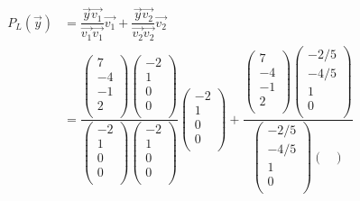 \documentclass[12pt,a4paper]{report}
\begin{document}
\begin{enumerate}
\begin{enumerate}
\begin{align*}
P_{L}(\vec{y})&=\dfrac{\vec{y}\vec{v_{1}}}{\vec{v_{1}}\vec{v_{1}}}\vec{v_{1}}+\dfrac{\vec{y}\vec{v_{2}}}{\vec{v_{2}}\vec{v_{2}}}\vec{v_{2}}\\
&=\dfrac{\begin{pmatrix}
7\\
-4\\
-1\\
2\\
\end{pmatrix}\begin{pmatrix}
-2\\
1\\
0\\
0\\
\end{pmatrix}}{\begin{pmatrix}
-2\\
1\\
0\\
0\\
\end{pmatrix}\begin{pmatrix}
-2\\
1\\
0\\
0\\
\end{pmatrix}}\begin{pmatrix}
-2\\
1\\
0\\
0\\
\end{pmatrix}+
\dfrac{\begin{pmatrix}
7\\
-4\\
-1\\
2\\
\end{pmatrix}\begin{pmatrix}
-2/5\\
-4/5\\
1\\
0\\
\end{pmatrix}}{\begin{pmatrix}
-2/5\\
-4/5\\
1\\
0\\
\end{pmatrix}\begin{pmatrix}

\end{pmatrix}}
\end{align*}
\end{enumerate}
\end{enumerate}
\end{document}
